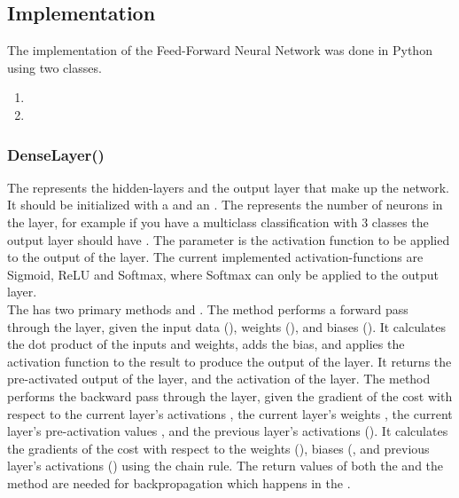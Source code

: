 \subsection{Implementation}
The implementation of the Feed-Forward Neural Network was done in Python using two classes. \\
\begin{enumerate}
    \item {}
    \item {}
    \end{enumerate}
\vspace{10pt}

\subsubsection{DenseLayer()}
The  represents the hidden-layers and the output layer that make up the network.
It should be initialized with a  and an .
The  represents the number of neurons in the layer, for example
if you have a multiclass classification with 3 classes the output layer should have .
The  parameter is the activation function to be applied to the output of the layer.
The current implemented activation-functions are Sigmoid, ReLU and Softmax, where Softmax can only be applied to the output layer.\\

The  has two primary methods  and .
The  method performs a forward pass through the layer, given the input data (), weights (), and biases ().
It calculates the dot product of the inputs and weights, adds the bias, and applies the activation function to the result to produce the output of the layer.
It returns the pre-activated output of the layer, and the activation of the layer.
The  method performs the backward pass through the layer, given the gradient of the cost with respect to the current layer's activations , the current layer's weights , the current layer's pre-activation values , and the previous layer's activations ().
It calculates the gradients of the cost with respect to the weights (), biases (, and previous layer's activations () using the chain rule.
The return values of both the  and the  method are needed for backpropagation which happens in the .


